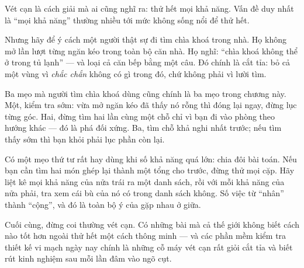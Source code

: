 \documentclass[../../algorithm.tex]{subfiles}
\begin{document}
\begin{dongian}
Vét cạn là cách giải mà ai cũng nghĩ ra: thử hết mọi khả năng. Vấn đề duy nhất là ``mọi khả năng'' thường nhiều tới mức không sống nổi để thử hết.

Nhưng hãy để ý cách một người thật sự đi tìm chìa khoá trong nhà. Họ không mở lần lượt từng ngăn kéo trong toàn bộ căn nhà. Họ nghĩ: ``chìa khoá không thể ở trong tủ lạnh'' --- và loại cả căn bếp bằng một câu. Đó chính là cắt tỉa: bỏ cả một vùng vì \emph{chắc chắn} không có gì trong đó, chứ không phải vì lười tìm.

Ba mẹo mà người tìm chìa khoá dùng cũng chính là ba mẹo trong chương này. Một, kiểm tra sớm: vừa mở ngăn kéo đã thấy nó rỗng thì đóng lại ngay, đừng lục từng góc. Hai, đừng tìm hai lần cùng một chỗ chỉ vì bạn đi vào phòng theo hướng khác --- đó là phá đối xứng. Ba, tìm chỗ khả nghi nhất trước; nếu tìm thấy sớm thì bạn khỏi phải lục phần còn lại.

Có một mẹo thứ tư rất hay dùng khi số khả năng quá lớn: chia đôi bài toán. Nếu bạn cần tìm hai món ghép lại thành một tổng cho trước, đừng thử mọi cặp. Hãy liệt kê mọi khả năng của nửa trái ra một danh sách, rồi với mỗi khả năng của nửa phải, tra xem cái bù của nó có trong danh sách không. Số việc từ ``nhân'' thành ``cộng'', và đó là toàn bộ ý của gặp nhau ở giữa.

Cuối cùng, đừng coi thường vét cạn. Có những bài mà cả thế giới không biết cách nào tốt hơn ngoài thử hết một cách thông minh --- và các phần mềm kiểm tra thiết kế vi mạch ngày nay chính là những cỗ máy vét cạn rất giỏi cắt tỉa và biết rút kinh nghiệm sau mỗi lần đâm vào ngõ cụt.
\end{dongian}
\end{document}
